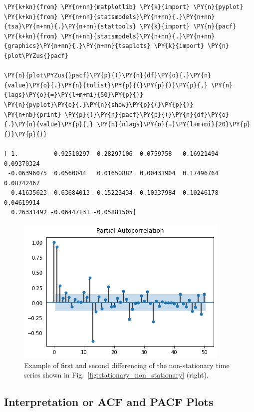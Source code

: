 \begin{tcolorbox}[breakable, size=fbox, boxrule=1pt, pad at break*=1mm,colback=cellbackground, colframe=cellborder]
\begin{Verbatim}[commandchars=\\\{\}]
\PY{k+kn}{from} \PY{n+nn}{matplotlib} \PY{k}{import} \PY{n}{pyplot}
\PY{k+kn}{from} \PY{n+nn}{statsmodels}\PY{n+nn}{.}\PY{n+nn}{tsa}\PY{n+nn}{.}\PY{n+nn}{stattools} \PY{k}{import} \PY{n}{pacf}
\PY{k+kn}{from} \PY{n+nn}{statsmodels}\PY{n+nn}{.}\PY{n+nn}{graphics}\PY{n+nn}{.}\PY{n+nn}{tsaplots} \PY{k}{import} \PY{n}{plot\PYZus{}pacf}

\PY{n}{plot\PYZus{}pacf}\PY{p}{(}\PY{n}{df}\PY{o}{.}\PY{n}{value}\PY{o}{.}\PY{n}{tolist}\PY{p}{(}\PY{p}{)}\PY{p}{,} \PY{n}{lags}\PY{o}{=}\PY{l+m+mi}{50}\PY{p}{)}
\PY{n}{pyplot}\PY{o}{.}\PY{n}{show}\PY{p}{(}\PY{p}{)}
\PY{n+nb}{print} \PY{p}{(}\PY{n}{pacf}\PY{p}{(}\PY{n}{df}\PY{o}{.}\PY{n}{value}\PY{p}{,} \PY{n}{nlags}\PY{o}{=}\PY{l+m+mi}{20}\PY{p}{)}\PY{p}{)}

[ 1.          0.92510297  0.28297106  0.0759758   0.16921494  0.09370324
 -0.06396075  0.0560044   0.01650882  0.00431904  0.17496764  0.08742467
  0.41635623 -0.63684013 -0.15223434  0.10337984 -0.10246178  0.04619914
  0.26331492 -0.06447131 -0.05881505]
\end{Verbatim}
\end{tcolorbox}

\begin{figure}[htb]
	\centering
	\includegraphics[width=0.7\linewidth]{figures/pacf_plot.png}
	\caption{Example of first and second differencing of the non-stationary time series shown in Fig.~\ref{fig:stationary_non_stationary} (right).}
	\label{fig:pacf}
\end{figure}
    
\subsection{Interpretation or ACF and PACF Plots}
\label{intuition-for-acf-and-pacf-plots}

